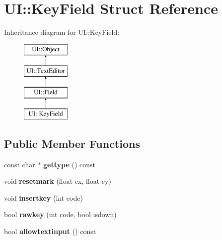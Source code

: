 \hypertarget{struct_u_i_1_1_key_field}{}\section{UI\+:\+:Key\+Field Struct Reference}
\label{struct_u_i_1_1_key_field}
Inheritance diagram for UI\+:\+:Key\+Field\+:\begin{figure}[H]
\begin{center}
\leavevmode
\includegraphics[height=4.000000cm]{struct_u_i_1_1_key_field}
\end{center}
\end{figure}
\subsection*{Public Member Functions}
\begin{DoxyCompactItemize}
\item 
\mbox{\label{struct_u_i_1_1_key_field_a348a1123c46d00c303cddcdc430ada81}} 
const char $\ast$ {\bfseries gettype} () const
\item 
\mbox{\label{struct_u_i_1_1_key_field_a70fb638906df713fd51eba1eb5dcda75}} 
void {\bfseries resetmark} (float cx, float cy)
\item 
\mbox{\label{struct_u_i_1_1_key_field_ad174c489c9b388bfb4cde1f58524ea16}} 
void {\bfseries insertkey} (int code)
\item 
\mbox{\label{struct_u_i_1_1_key_field_aa7f3f93521bcad27ce1cf8eb7253b4b3}} 
bool {\bfseries rawkey} (int code, bool isdown)
\item 
\mbox{\label{struct_u_i_1_1_key_field_aacb5647aa3c65b459290a408e62374a8}} 
bool {\bfseries allowtextinput} () const
\end{DoxyCompactItemize}
